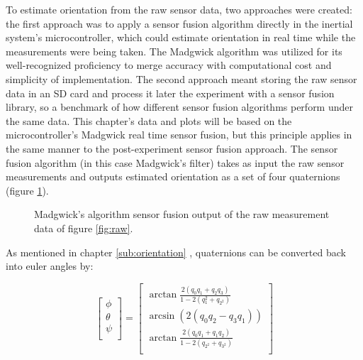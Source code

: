 To estimate orientation from the raw sensor data, two approaches were created: the first approach was to apply a sensor fusion algorithm directly in the inertial system's microcontroller, which could estimate orientation in real time while the measurements were being taken. The Madgwick algorithm was utilized for its well-recognized proficiency to merge accuracy with computational cost and simplicity of implementation. The second approach meant storing the raw sensor data in an SD card and process it later the experiment with a sensor fusion library, so a benchmark of how different sensor fusion algorithms perform under the same data. This chapter's data and plots will be based on the microcontroller's Madgwick real time sensor fusion, but this principle applies in the same manner to the post-experiment sensor fusion approach. The sensor fusion algorithm (in this case Madgwick's filter) takes as input the raw sensor measurements and outputs estimated orientation as a set of four quaternions (figure \ref{fig:fusion_output}).


\begin{figure}[!h]
    \centering
    \resizebox{0.8\linewidth}{!}{}
    \caption{Madgwick's algorithm sensor fusion output of the raw measurement data of figure \ref{fig:raw}.}
    \label{fig:fusion_output}
\end{figure}


As mentioned in chapter \ref{sub:orientation} , quaternions can be converted back into euler angles by:

\begin{equation}
    \begin{bmatrix}
        \phi   \\
        \theta \\
        \psi   \\
    \end{bmatrix}
    =
    \begin{bmatrix}
        \arctan \frac{2(q_0q_1+q_2q_3)}{1-2(q{_1^2}+q_{2^2})} \\
        \arcsin (2(q_0q_2-q_3q_1))                            \\
        \arctan \frac{2(q_0q_1+q_1q_2)}{1-2(q_{2^2}+q_{3^2})} \\
    \end{bmatrix}
\end{equation}

